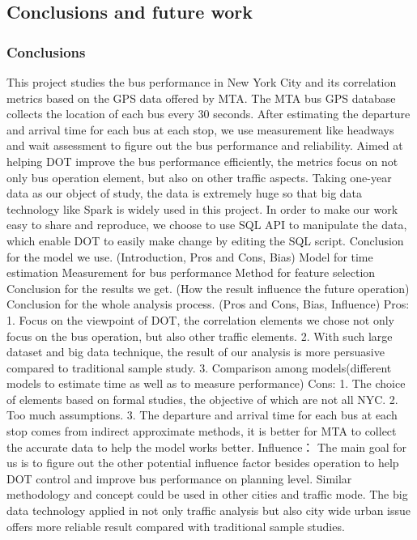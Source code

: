 \documentclass[12pt]{report}
\begin{document}
\subsection{Conclusions and future work}

\subsubsection*{Conclusions}

This project studies the bus performance in New York City and its correlation metrics based on the GPS data offered by MTA. The MTA bus GPS database collects the location of each bus every 30 seconds. After estimating the departure and arrival time for each bus at each stop, we use measurement like headways and wait assessment to figure out the bus performance and reliability. Aimed at helping DOT improve the bus performance efficiently, the metrics focus on not only bus operation element, but also on other traffic aspects. Taking one-year data as our object of study, the data is extremely huge so that big data technology like Spark is widely used in this project. In order to make our work easy to share and reproduce, we choose to use SQL API to manipulate the data, which enable DOT to easily make change by editing the SQL script. 
Conclusion for the model we use. (Introduction, Pros and Cons, Bias)
Model for time estimation
Measurement for bus performance
Method for feature selection
Conclusion for the results we get. (How the result influence the future operation)
Conclusion for the whole analysis process. (Pros and Cons, Bias, Influence)
Pros:
1. Focus on the viewpoint of DOT, the correlation elements we chose not only focus on the bus operation, but also other traffic elements.
2. With such large dataset and big data technique, the result of our analysis is more persuasive compared to traditional sample study.
3. Comparison among models(different models to estimate time as well as to measure performance)
Cons:
1. The choice of elements based on formal studies, the objective of which are not all NYC.
2. Too much assumptions.
3. The departure and arrival time for each bus at each stop comes from indirect approximate methods, it is better for MTA to collect the accurate data to help the model works better.
Influence：
The main goal for us is to figure out the other potential influence factor besides operation to help DOT control and improve bus performance on planning level. Similar methodology and concept could be used in other cities and traffic mode. The big data technology applied in not only traffic analysis but also city wide urban issue offers more reliable result compared with traditional sample studies. 
\end{document}
